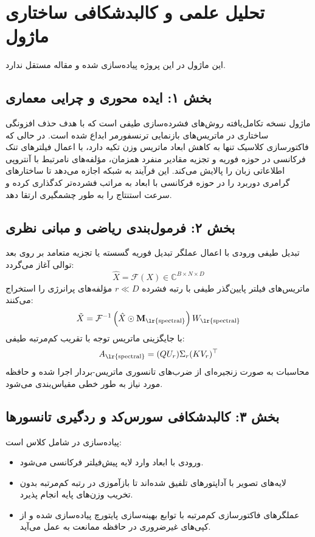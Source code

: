 \section{تحلیل علمی و کالبدشکافی ساختاری ماژول }

این ماژول در این پروژه پیاده‌سازی شده و مقاله مستقل ندارد.
\label{sec:spectra_v2}

\subsection*{بخش ۱: ایده محوری و چرایی معماری }
ماژول  نسخه تکامل‌یافته روش‌های فشرده‌سازی طیفی است که با هدف حذف افزونگی ساختاری در ماتریس‌های بازنمایی ترنسفورمر ابداع شده است. در حالی که فاکتورسازی کلاسیک تنها به کاهش ابعاد ماتریس وزن تکیه دارد،  با اعمال فیلترهای تنک فرکانسی در حوزه فوریه و تجزیه مقادیر منفرد همزمان، مؤلفه‌های نامرتبط با آنتروپی اطلاعاتی زبان را پالایش می‌کند. این فرآیند به شبکه اجازه می‌دهد تا ساختارهای گرامری دوربرد را در حوزه فرکانسی با ابعاد به مراتب فشرده‌تر کدگذاری کرده و سرعت استنتاج را به طور چشمگیری ارتقا دهد.

\subsection*{بخش ۲: فرمول‌بندی ریاضی و مبانی نظری }
تبدیل طیفی ورودی با اعمال عملگر تبدیل فوریه گسسته یا تجزیه متعامد بر روی بعد توالی آغاز می‌گردد:
\begin{equation}
\hat{X} = \mathcal{F}(X) \in \mathbb{C}^{B \times N \times D}
\end{equation}
ماتریس‌های فیلتر پایین‌گذر طیفی با رتبه فشرده $r \ll D$ مؤلفه‌های پرانرژی را استخراج می‌کنند:
\begin{equation}
\tilde{X} = \mathcal{F}^{-1}\left( \hat{X} \odot \mathbf{M}_{\text{\lr{spectral}}} \right) W_{\text{\lr{spectral}}}
\end{equation}
با جایگزینی ماتریس توجه با تقریب کم‌مرتبه طیفی:
\begin{equation}
A_{\text{\lr{spectral}}} = (Q U_r) \Sigma_r (K V_r)^\top
\end{equation}
محاسبات به صورت زنجیره‌ای از ضرب‌های تانسوری ماتریس-بردار اجرا شده و حافظه مورد نیاز به طور خطی مقیاس‌بندی می‌شود.

\subsection*{بخش ۳: کالبدشکافی سورس‌کد و ردگیری تانسورها }
پیاده‌سازی در  شامل کلاس  است:
\begin{itemize}
    \item ورودی با ابعاد \lr{$[B, N, D]$} وارد لایه پیش‌فیلتر فرکانسی می‌شود.
    \item لایه‌های تصویر با آداپتورهای  تلفیق شده‌اند تا بازآموزی در رتبه کم‌مرتبه بدون تخریب وزن‌های پایه انجام پذیرد.
    \item عملگرهای فاکتورسازی کم‌مرتبه با توابع بهینه‌سازی پایتورچ پیاده‌سازی شده و از کپی‌های غیرضروری در حافظه ممانعت به عمل می‌آید.
\end{itemize}

